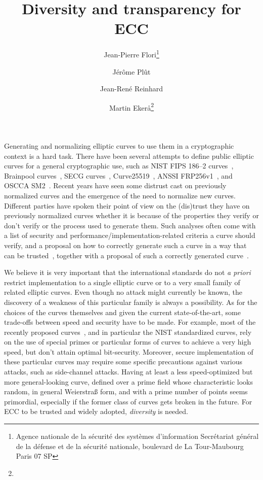\documentclass[twocolumn,letterpaper,10pt]{article}
\title{Diversity and transparency for ECC}
\author{Jean-Pierre Flori\thanks{Agence nationale de la sécurité des systèmes d'information\newline%
Secrétariat général de la défense et de la sécurité nationale\newline%
51, boulevard de La Tour-Maubourg\newline%
75700 Paris 07 SP}%
\and Jérôme Plût\footnotemark[1]%
\and Jean-René Reinhard\footnotemark[1]%
\and Martin Ekerå\thanks{}}
\date{}
\def\gitkw$#1:#2${{\small \textbf{#1:} \texttt{#2}}}
\begin{document}
\sloppy
\maketitle
\thispagestyle{fancy}\cfoot{}
\lhead{\gitkw $Author:$}
\chead{\gitkw $Id:$}
\rhead{\gitkw $Date:$}
Generating and normalizing elliptic curves to use them in a cryptographic
context is a hard task.
There have been several attempts to define public elliptic curves
for a general cryptographic use,
such as NIST FIPS 186--2 curves~\cite{nist2000fips186-2},
Brainpool curves~\cite{rfc5639},
SECG curves~\cite{certicom2010sec2},
Curve25519~\cite{pkc2006bernstein},
ANSSI FRP256v1~\cite{jorf2011ce},
and OSCCA SM2~\cite{oscca2010sm2}.
Recent years have seen some distrust cast on previously normalized
curves
and the emergence of the need to normalize new curves.
Different parties have spoken their point of view on the (dis)trust they have
on previously normalized curves whether it is because of
the properties they verify or don't verify
or the process used to generate them.
Such analyses often come with
a list of security and performance/implementation-related criteria
a curve should verify,
and a proposal on how to correctly generate such a curve in a way that can be
trusted~\cite{safecurves,msr2014bcln,brainpool2005,eprint2014brainpool,eprint2013abgr},
together with a proposal of such a correctly generated
curve~\cite{pkc2006bernstein,msr2014bcln,eprint2013abgr}.

\medskip
We believe it is very important that the international standards
do not \emph{a priori} restrict implementation
to a single elliptic curve
or to a very small family of related elliptic curves.
Even though no attack might currently be known,
the discovery of a weakness of this particular family
is always a possibility.
As for the choices of the curves themselves
and given the current state-of-the-art,
some trade-offs between speed and security have to be made.
For example, most of the recently proposed
curves~\cite{pkc2006bernstein,msr2014bcln,eprint2013abgr,oscca2010sm2},
and in particular the NIST standardized curves,
rely on the use of special primes or particular forms of curves to
achieve a very high speed,
but don't attain optimal bit-security.
Moreover, secure implementation of these particular curves
may require some specific precautions against various attacks,
such as side-channel attacks.
Having at least a less speed-optimized but more general-looking curve,
defined over a prime field whose characteristic looks random,
in general Weierstraß form, and with a prime number of points
seems primordial,
especially if the former class of curves gets broken in the future.
For ECC to be trusted and widely adopted, \emph{diversity} is needed.
\end{document}
